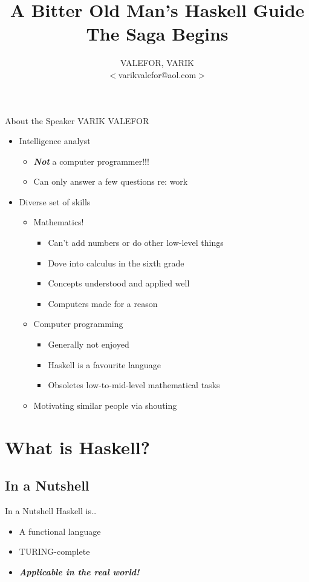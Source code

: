 \documentclass{beamer}
\title[The Saga Begins]{A Bitter Old Man's Haskell Guide \\ \small{The Saga Begins}}
\author[VALEFOR, VARIK]{VALEFOR, VARIK \\ $<$varikvalefor@aol.com$>$}
\begin{document}
	\maketitle
	\tableofcontents
	\begin{frame}{About the Speaker}
		VARIK VALEFOR
			\begin{itemize}
				\item Intelligence analyst
				\begin{itemize}
					\item \textbf{\textit{Not}} a computer programmer!!!
					\item Can only answer a few questions re: work
				\end{itemize}
				\item Diverse set of skills
			\begin{itemize}
				\item Mathematics!
				\begin{itemize}
					\item Can't add numbers or do other low-level things
					\item Dove into calculus in the sixth grade
					\item Concepts understood and applied well
					\item Computers made for a reason
				\end{itemize}
				\item Computer programming
				\begin{itemize}
					\item Generally not enjoyed
					\item Haskell is a favourite language
					\item Obsoletes low-to-mid-level mathematical tasks
				\end{itemize}
				\item Motivating similar people via shouting
			\end{itemize}
		\end{itemize}
	\end{frame}
	\section{What is Haskell?}
		\subsection{In a Nutshell}
			\begin{frame}{In a Nutshell}
				Haskell is\dots
				\begin{itemize}
					\item A functional language
					\item TURING-complete
					\item \textit{\textbf{Applicable in the real world!}}
				\end{itemize}
			\end{frame}
\end{document}
